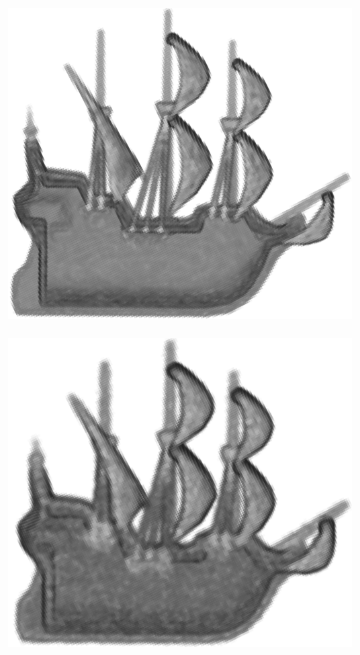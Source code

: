 \begin{figure}[ht]
	\centering
	\begin{subfigure}[t]{0.24\linewidth}\centering
		\includegraphics[width=1\linewidth]{./fig/eval/noise_none.png}
		\label{fig/eval/noise_none}
	\end{subfigure}
	\begin{subfigure}[t]{0.24\linewidth}\centering
		\includegraphics[width=1\linewidth]{./fig/eval/noise_low.png}

\end{subfigure}
\end{figure}
